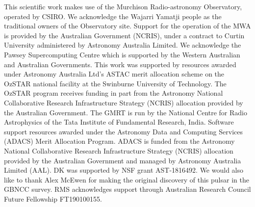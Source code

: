 \documentclass[linenumbers]{aastex631}
\begin{document}
\begin{acknowledgements}
This scientific work makes use of the Murchison Radio-astronomy Observatory, operated by CSIRO. We acknowledge the Wajarri Yamatji people as the traditional owners of the Observatory site. Support for the operation of the MWA is provided by the Australian Government (NCRIS), under a contract to Curtin University administered by Astronomy Australia Limited.
We acknowledge the Pawsey Supercomputing Centre which is supported by the Western Australian and Australian Governments.
This work was supported by resources awarded under Astronomy Australia Ltd's ASTAC merit allocation scheme on the OzSTAR national facility at the Swinburne University of Technology. The OzSTAR program receives funding in part from the Astronomy National Collaborative Research Infrastructure Strategy (NCRIS) allocation provided by the Australian Government.
The GMRT is run by the National Centre for Radio Astrophysics
of the Tata Institute of Fundamental Research, India.
Software support resources awarded under the Astronomy Data and Computing Services (ADACS) Merit Allocation Program.
ADACS is funded from the Astronomy National Collaborative Research Infrastructure Strategy (NCRIS) allocation provided by the Australian Government and managed by Astronomy Australia Limited (AAL).
DK was supported by NSF grant AST-1816492.
We would also like to thank Alex McEwen for making the original discovery of this pulsar in the GBNCC survey.
RMS acknowledges support through Australian Research Council Future Fellowship FT190100155.
\end{acknowledgements}

{}



\end{document}
